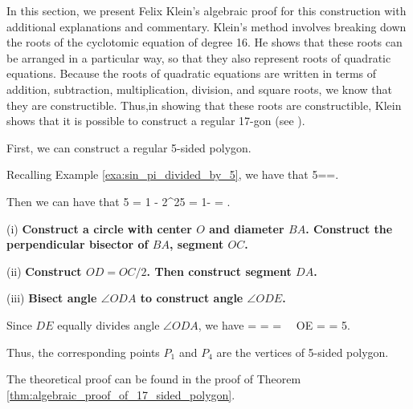In this section, we present Felix Klein's algebraic proof for this construction with additional explanations and commentary. Klein's method involves breaking down the roots of the cyclotomic equation of degree 16. He shows that these roots can be arranged in a particular way, so that they also represent roots of quadratic equations. Because the roots of quadratic equations are written in terms of addition, subtraction, multiplication, division, and square roots, we know that they are constructible. Thus,in showing that these roots are constructible, Klein shows that it is possible to construct a regular 17-gon (see \cite{Klein_1897}).

First, we can construct a regular 5-sided polygon.

\begin{example}
Recalling Example \ref{exa:sin_pi_divided_by_5}, we have that 
\be
\sin\frac{\pi}5==.
\ee 

Then we can have that 
\be
\cos \frac{2\pi}5 = 1 - 2\sin^2\frac{\pi}5 = 1-  = .
\ee
 

\ben
\item [(i)] {\bf Construct a circle with center $O$ and diameter $BA$. Construct the perpendicular bisector of $BA$, segment $OC$.}
\item [(ii)] {\bf Construct $OD = OC/2$. Then construct segment $DA$.}
\item [(iii)] {\bf Bisect angle $\angle ODA$ to construct angle $\angle ODE$.}

Since $DE$ equally divides angle $\angle ODA$, we have 
\be
{} =  =   =  \ \ra \ OE =  = \cos \frac{2\pi}5.
\ee

Thus, the corresponding points $P_1$ and $P_4$ are the vertices of 5-sided polygon.

The theoretical proof can be found in the proof of Theorem \ref{thm:algebraic_proof_of_17_sided_polygon}. 


\end{example}

